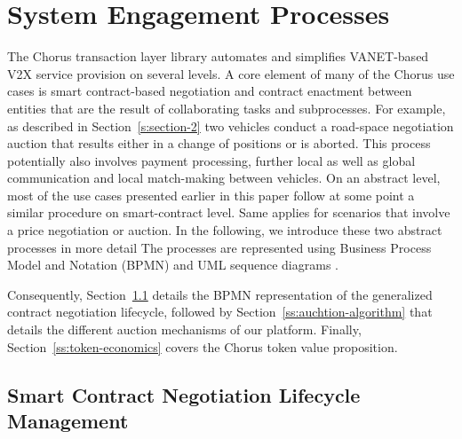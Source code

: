 \documentclass{llncs}
\begin{document}
{	%
	
	\section{System Engagement Processes}
		\label{s:section-5}	
	
	
		The Chorus transaction layer library automates and simplifies VANET-based V2X service provision on several levels. A core element of many of the Chorus use cases is smart contract-based negotiation and contract enactment between entities that are the result of collaborating tasks and subprocesses. For example, as described in Section~\ref{s:section-2} two vehicles conduct a road-space negotiation auction that results either in a change of positions or is aborted. This process potentially also involves payment processing, further local as well as global communication and local match-making between vehicles. On an abstract level, most of the use cases presented earlier in this paper follow at some point a similar procedure on smart-contract level. Same applies for scenarios that involve a price negotiation or auction. In the following, we introduce these two abstract processes in more detail
		The processes are represented using Business Process Model and Notation (BPMN) \cite{model2011notation} and UML sequence diagrams \cite{msequenceDiagrams}.
		
		Consequently, Section~\ref{ss:smart-contract-lifecycle-management} details the BPMN representation of the generalized contract negotiation lifecycle, followed by Section~\ref{ss:auchtion-algorithm} that details the different auction mechanisms of our platform. Finally, Section~\ref{ss:token-economics} covers the Chorus token value proposition.



		
		\subsection{Smart Contract Negotiation Lifecycle Management}
			\label{ss:smart-contract-lifecycle-management}
			
}
\end{document}
